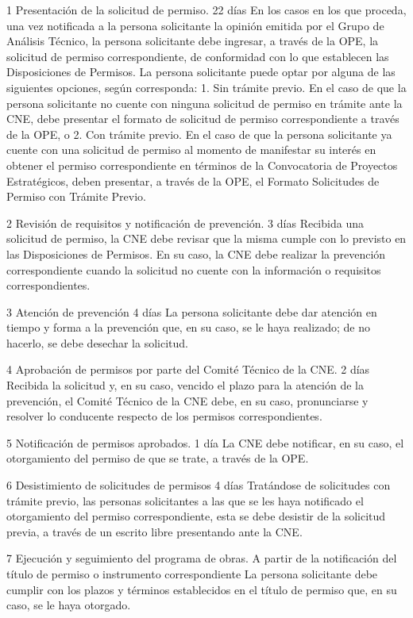  1
 Presentación de la solicitud de permiso.
 22 días
 En los casos en los que proceda, una vez notificada a la persona solicitante la opinión emitida por el Grupo de Análisis Técnico, la persona solicitante debe ingresar, a través de la OPE, la solicitud de permiso correspondiente, de conformidad con lo que establecen las Disposiciones de Permisos.
La persona solicitante puede optar por alguna de las siguientes opciones, según corresponda:
1.	Sin trámite previo. En el caso de que la persona solicitante no cuente con ninguna solicitud de permiso en trámite ante la CNE, debe presentar el formato de solicitud de permiso correspondiente a través de la OPE, o
2.	Con trámite previo. En el caso de que la persona solicitante ya cuente con una solicitud de permiso al momento de manifestar su interés en obtener el permiso correspondiente en términos de la Convocatoria de Proyectos Estratégicos, deben presentar, a través de la OPE, el Formato Solicitudes de Permiso con Trámite Previo.
 
 2
 Revisión de requisitos y notificación de prevención.
 3 días
 Recibida una solicitud de permiso, la CNE debe revisar que la misma cumple con lo previsto en las Disposiciones de Permisos. En su caso, la CNE debe realizar la prevención correspondiente cuando la solicitud no cuente con la información o requisitos correspondientes.
 
 3
 Atención de prevención
 4 días
 La persona solicitante debe dar atención en tiempo y forma a la prevención que, en su caso, se le haya realizado; de no hacerlo, se debe desechar la solicitud.
 
 4
 Aprobación de permisos por parte del Comité Técnico de la CNE.
 2 días
 Recibida la solicitud y, en su caso, vencido el plazo para la atención de la prevención, el Comité Técnico de la CNE debe, en su caso, pronunciarse y resolver lo conducente respecto de los permisos correspondientes.
 
 5
 Notificación de permisos aprobados.
 1 día
 La CNE debe notificar, en su caso, el otorgamiento del permiso de que se trate, a través de la OPE.
 
 6
 Desistimiento de solicitudes de permisos
 4 días
 Tratándose de solicitudes con trámite previo, las personas solicitantes a las que se les haya notificado el otorgamiento del permiso correspondiente, esta se debe desistir de la solicitud previa, a través de un escrito libre presentando ante la CNE.
 
 7
 Ejecución y seguimiento del programa de obras.
 A partir de la notificación del título de permiso o instrumento correspondiente
 La persona solicitante debe cumplir con los plazos y términos establecidos en el título de permiso que, en su caso, se le haya otorgado.
 
